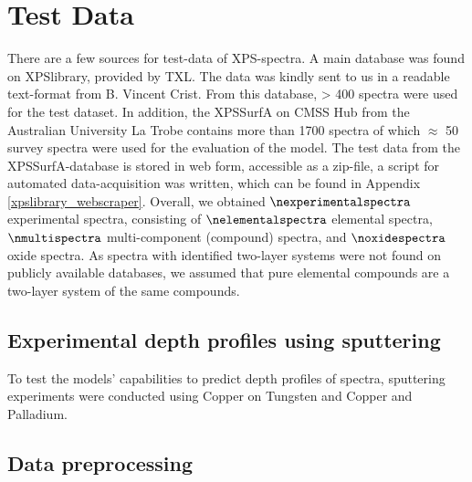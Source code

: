 
\section{Test Data}
\label{test_data}

There are a few sources for test-data of XPS-spectra. A main database was found on XPSlibrary, provided by TXL. The data was kindly sent to us in a readable text-format from B. Vincent Crist. From this database, > 400 spectra were used for the test dataset. In addition, the XPSSurfA on CMSS Hub from the Australian University La Trobe contains more than 1700 spectra of which $\approx$ 50 survey spectra were used for the evaluation of the model. The test data from the XPSSurfA-database is stored in web form, accessible as a zip-file, a script for automated data-acquisition was written, which can be found in Appendix \ref{xpslibrary_webscraper}.
Overall, we obtained $\nexperimentalspectra$ experimental spectra, consisting of $\nelementalspectra$ elemental spectra, $\nmultispectra$  multi-component (compound) spectra, and $\noxidespectra$ oxide spectra.
As spectra with identified two-layer systems were not found on publicly available databases, we assumed that pure elemental compounds are a two-layer system of the same compounds.

\subsection{Experimental depth profiles using sputtering}
To test the models' capabilities to predict depth profiles of spectra, sputtering experiments were conducted using Copper on Tungsten and Copper and Palladium.


\subsection{Data preprocessing}

